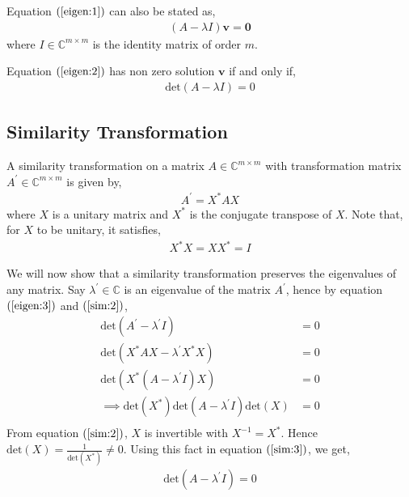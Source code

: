\documentclass[12pt]{article}
\newcommand{\vecb}[1]{\mathbf{#1}}
\newcommand{\brak}[1]{\ensuremath{\left(#1\right)}}
\newcommand{\defmat}[2]{#1\in\mathbb{C}^{#2\times#2}}
\begin{document}
Equation \brak{\ref{eigen:1}} can also be stated as,
\begin{align}
\label{eigen:2}
   \brak{A - \lambda I} \vecb{v} = \vecb{0} 
\end{align}
where $I \in \mathbb{C}^{m \times m}$ is the identity matrix of order $m$.
\newline

Equation \brak{\ref{eigen:2}} has non zero solution $\vecb{v}$ if and only if, 
\begin{align}
\label{eigen:3}
    \text{det}\brak{A - \lambda I} = 0
\end{align}

\subsection{Similarity Transformation}
A similarity transformation on a matrix $\defmat{A}{m}$ with transformation matrix $\defmat{A^{\prime}}{m}$ is given by,
\begin{align}
    A^{\prime} = X^{\ast} A X
\end{align}
where $X$ is a unitary matrix and $X^{\ast}$ is the conjugate transpose of $X$.
Note that, for $X$ to be unitary, it satisfies,
\begin{align}
    \label{sim:2}
    X^{\ast}X = XX^{\ast} = I
\end{align}

We will now show that a similarity transformation preserves the eigenvalues of any matrix.
\newline
Say $\lambda^{\prime} \in \mathbb{C}$ is an eigenvalue of the matrix $A^{\prime}$, hence by equation \brak{\ref{eigen:3}} and \brak{\ref{sim:2}},
\begin{align}
    \text{det}\brak{A^{\prime} - \lambda^{\prime} I} &= 0\\
    \text{det}\brak{X^{\ast}AX - \lambda^{\prime} X^{\ast}X} &= 0\\
    \text{det}\brak{X^{\ast}\brak{A - \lambda^{\prime}I} X} &= 0\\
    \label{sim:3} \implies \text{det}\brak{X^{\ast}} \text{det}\brak{A - \lambda^{\prime}I} \text{det}\brak{X} &= 0\\
\end{align}
From equation \brak{\ref{sim:2}}, $X$ is invertible with $X^{-1} = X^{\ast}$. Hence $\text{det} \brak{X} = \frac{1}{\text{det} \brak{X^{\ast}}}\neq 0$.
\newline
Using this fact in equation \brak{\ref{sim:3}}, we get,
\begin{align}
    \text{det}\brak{A - \lambda^{\prime} I} = 0
\end{align}
\end{document}
